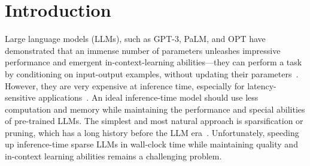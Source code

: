 \vspace{-1mm}
\section{Introduction}
\label{sec:introduction}












Large language models (LLMs), such as GPT-3, PaLM, and OPT have demonstrated that an immense number of parameters unleashes impressive performance and emergent in-context-learning abilities---they can perform a task by conditioning on input-output examples, without updating their parameters~\cite{bommasani2021opportunities,liang2022holistic,brown2020language,min2022rethinking,chan2022data}. However, they are very expensive at inference time, especially for latency-sensitive applications~\cite{pope2022efficiently}. An ideal inference-time model should use less computation and memory while maintaining the performance and special abilities of pre-trained LLMs. The simplest and most natural approach is sparsification or pruning, which has a long history before the LLM era~\cite{lecun1989optimal}. Unfortunately, speeding up inference-time sparse LLMs in wall-clock time while maintaining quality and in-context learning abilities remains a challenging problem.

